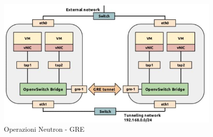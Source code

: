 \documentclass{article}
\begin{document}
\begin{figure}[H]
    \centering
    \includegraphics[scale=0.4]{img/Neutron GRE.png}
    \caption{Operazioni Neutron - GRE}
\end{figure}\noindent
\end{document}
